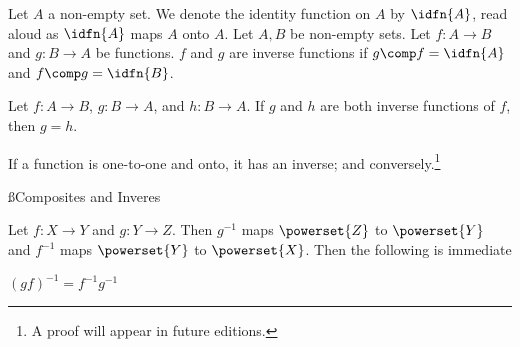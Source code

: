 
Let $A$ a non-empty set.
We denote the identity
function on $A$ by $\idfn{A}$,
read aloud as
$\idfn{A}$ maps $A$ onto $A$.
Let $A, B$ be non-empty sets.
Let $f: A \to B$ and $g: B \to A$
be functions.
$f$ and $g$ are inverse functions
if $g \comp f = \idfn{A}$
and $f \comp g = \idfn{B}$.



\begin{proposition}[Uniqueness]
  Let $f: A \to B$,
  $g: B \to A$,
  and $h: B \to A$.
  If $g$ and $h$
  are both inverse
  functions of $f$,
  then $g = h$.
\end{proposition}

\begin{proposition}[Existence]
  If a function is one-to-one and onto, it has an inverse; and conversely.\footnote{A proof will appear in future editions.}
\end{proposition}

\ss{Composites and Inveres}

Let $f: X \to Y$ and $g: Y \to Z$.
Then $g^{-1}$ maps $\powerset{Z}$ to $\powerset{Y}$ and $f^{-1}$ maps $\powerset{Y}$ to $\powerset{X}$.
Then the following is immediate
{\small
\begin{proposition}
  $(gf)^{-1} = f^{-1}g^{-1}$
\end{proposition}
}

%

%

